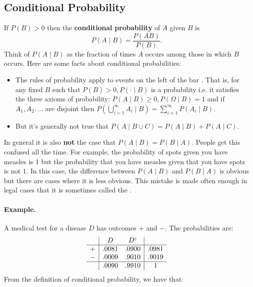 \documentclass[
  14pt,
]{memoir}
\begin{document}
\hypertarget{conditional-probability}{%
\subsection{Conditional Probability}\label{conditional-probability}}

If \(P(B)>0\) then the \textbf{conditional probability} of \(A\) given \(B\) is
\[
P(A \mid B)=\frac{P(A B)}{P(B)}.
\]
Think of \(P(A \mid B)\) as the fraction of times \(A\) occurs among those in which \(B\) occurs. Here are some facts about conditional probabilities:

\begin{itemize}
\item The rules of probability apply to events on the left of the bar \say{$\mid$}. That is, for any fixed $B$ such that $P(B)>0, P(\cdot \mid B)$ is a probability i.e. it satisfies the three axioms of probability: $P(A \mid B) \geq 0, P(\Omega \mid B)=1$ and if $A_{1}, A_{2}, \ldots$ are disjoint then $P\left(\bigcup_{i=1}^{\infty} A_{i} \mid B\right)=\sum_{i=1}^{\infty} P\left(A_{i} \mid B\right)$.
\item But it's generally not true that $P(A \mid B \cup C)=P(A \mid B)+P(A \mid C)$. 
\end{itemize}

In general it is also \textbf{not} the case that \(P(A \mid B)=P(B \mid A)\). People get this confused all the time. For example, the probability of spots given you have measles is 1 but the probability that you have measles given that you have spots is not \(1 .\) In this case, the difference between \(P(A \mid B)\) and \(P(B \mid A)\) is obvious but there are cases where it is less obvious. This mistake is made often enough in legal cases that it is sometimes called the .

\bigskip

\paragraph*{Example.}

A medical test for a disease \(D\) has outcomes \(+\) and \(-\). The probabilities are:
\[
\begin{array}{c|cc|c} 
& D & D^{c} \\
\hline
+ & .0081 & .0900 &  .0981\\
- & .0009 & .9010 &  .9019\\
\hline
  & .0090 & .9910 &  1
\end{array}
\]
From the definition of conditional probability, we have that:
\end{document}
